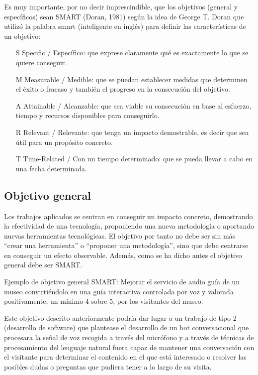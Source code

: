 Es muy importante, por no decir imprescindible, que los objetivos (general y específicos) sean SMART (Doran, 1981) según la idea de George T. Doran que utilizó la palabra smart (inteligente en inglés) para definir las características de un objetivo:
\begin{itemize}
	\item[S] Specific / Específico: que exprese claramente qué es exactamente lo que se quiere conseguir.
	\item[M] Measurable / Medible: que se puedan establecer medidas que determinen el éxito o fracaso y también el progreso en la consecución del objetivo.
	\item[A] Attainable / Alcanzable: que sea viable su consecución en base al esfuerzo, tiempo y recursos disponibles para conseguirlo.
	\item[R] Relevant / Relevante: que tenga un impacto demostrable, es decir que sea útil para un propósito concreto.
	\item[T] Time-Related / Con un tiempo determinado: que se pueda llevar a cabo en una fecha determinada.
\end{itemize}

\subsection{Objetivo general}

Los trabajos aplicados se centran en conseguir un impacto concreto, demostrando la efectividad de una tecnología, proponiendo una nueva metodología o aportando nuevas herramientas tecnológicas. El objetivo por tanto no debe ser sin más “crear una herramienta” o “proponer una metodología”, sino que debe centrarse en conseguir un efecto observable. Además, como se ha dicho antes el objetivo general debe ser SMART.

Ejemplo de objetivo general SMART: Mejorar el servicio de audio guía de un museo convirtiéndolo en una guía interactiva controlada por voz y valorada positivamente, un mínimo 4 sobre 5, por los visitantes del museo.

Este objetivo descrito anteriormente podría dar lugar a un trabajo de tipo 2 (desarrollo de software) que plantease el desarrollo de un bot conversacional que procesara la señal de voz recogida a través del micrófono y a través de técnicas de procesamiento del lenguaje natural fuera capaz de mantener una conversación con el visitante para determinar el contenido en el que está interesado o resolver las posibles dudas o preguntas que pudiera tener a lo largo de su visita.

